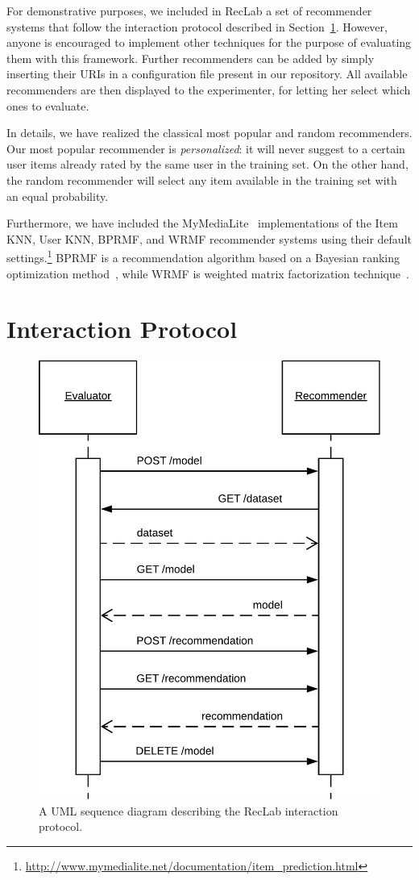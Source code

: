 For demonstrative purposes, we included in RecLab a set of recommender systems that follow the interaction protocol described in Section~\ref{lab:sec:interaction}. However, anyone is encouraged to implement other techniques for the purpose of evaluating them with this framework. Further recommenders can be added by simply inserting their URIs in a configuration file present in our repository. All available recommenders are then displayed to the experimenter, for letting her select which ones to evaluate.

In details, we have realized the classical most popular and random recommenders. Our most popular recommender is \emph{personalized}: it will never suggest to a certain user items already rated by the same user in the training set. On the other hand, the random recommender will select any item available in the training set with an equal probability.

Furthermore, we have included the MyMediaLite~\cite{Gantner2011} implementations of the Item KNN, User KNN, BPRMF, and WRMF recommender systems using their default settings.\footnote{\url{http://www.mymedialite.net/documentation/item_prediction.html}} BPRMF is a recommendation algorithm based on a Bayesian ranking optimization method~\cite{Rendle2009}, while WRMF is weighted matrix factorization technique~\cite{Hu2008}.

\section{Interaction Protocol}
\label{lab:sec:interaction}

\begin{figure}
\centering
\includegraphics[width=.65\linewidth]{uml}
\caption[RecLab interaction protocol]{A UML sequence diagram describing the RecLab interaction protocol.}
\label{lab:fig:sequence}
\end{figure}

